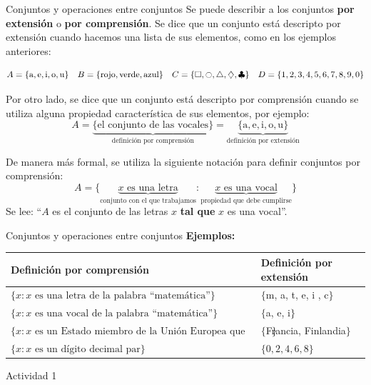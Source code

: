 \documentclass[9pt, aspectratio=169]{beamer}
\begin{document}
\begin{frame}{Conjuntos y operaciones entre conjuntos}
    Se puede describir a los conjuntos \textbf{por extensión} o \textbf{por comprensión}. Se dice que un conjunto está descripto por extensión cuando hacemos una lista de sus elementos, como en los ejemplos anteriores:

\[ A = \{ \text{a}, \text{e}, \text{i}, \text{o}, \text{u} \} \quad B = \{ \text{rojo}, \text{verde}, \text{azul} \} \quad C = \{ \square, \ocircle, \triangle, \diamondsuit, \clubsuit\} \quad  D  = \{1, 2, 3, 4, 5, 6,7 ,8, 9, 0 \}  \] 

Por otro lado, se dice que un conjunto está descripto por comprensión cuando se utiliza alguna propiedad característica de sus elementos, por ejemplo:
\[ A = \underbrace{\{ \text{el conjunto de las vocales} \}}_{\text{definición por comprensión}} = \underbrace{ \{ \text{a}, \text{e}, \text{i}, \text{o}, \text{u} \} }_{\text{definición por extensión}} \]

De manera más formal, se utiliza la siguiente notación para definir conjuntos por comprensión:
\[ A = \{ \underbrace{x \text{ es una letra}}_{\text{conjunto con el que trabajamos}} : \underbrace{x \text{ es una vocal}}_{\text{propiedad que debe cumplirse}} \} \]
Se lee: ``$A$ es el conjunto de las letras $x$ \textbf{tal que} $x$ es una vocal''. 
\end{frame}

\begin{frame}{Conjuntos y operaciones entre conjuntos}
\textbf{Ejemplos:}
    \begin{center}
        \begin{tabular}{p{9.5cm} p{4cm}}
            \toprule
            \textbf{Definición por comprensión} & \textbf{Definición por extensión} \\
            \midrule
            $\{ x : x \text{ es una letra de la palabra ``matemática''} \}$ & $\{$m, a, t, e, i , c$\}$ \\
            $\{ x : x \text{ es una vocal de la palabra ``matemática''}\}$ & $\{$a, e, i$\}$ \\
            $\{ x : x \text{ es un Estado miembro de la Unión Europea que empieza con ``F''}\}$ & $\{$Francia, Finlandia$\}$ \\
            $\{ x : x \text{ es un dígito decimal par}\}$ & $\{0, 2, 4, 6, 8\}$ \\
            \bottomrule
        \end{tabular}
    \end{center}

\vspace{3em}
\begin{center}
    {\Large \alert{\faArrowCircleRight \faPen* Actividad 1}}
\end{center}
\end{frame}
\end{document}
